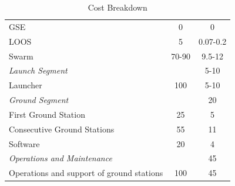 \begin{table}[htbp]
\begin{tabular}{p{10cm} | c | c }
       \hspace{2.5cm}GSE &         0 &          0\\

      \hspace{2.5cm}LOOS &         5 &         0.07-0.2 \\ \hline

     \hspace{2.0cm}Swarm &         70-90 &         9.5-12 \\ \hline

\textit{Launch Segment} &         &         5-10 \\ \hline

  \hspace{1.0cm}Launcher &         100 &        5-10  \\ \hline

\textit{Ground Segment} &          &     20     \\ \hline

\hspace{1.0cm}First Ground Station &         25 &      5    \\

\hspace{1.0cm}Consecutive Ground Stations &         55 &     11     \\

\hspace{1.0cm}Software &         20 &     4     \\ \hline

\textit{Operations and Maintenance} &          &        45  \\ \hline

\hspace{1.0cm}Operations and support of ground stations &         100 &   45       \\
	
\end{tabular} 
\caption{Cost Breakdown}
	\label{tab:CostBreakdown} 
\end{table}



